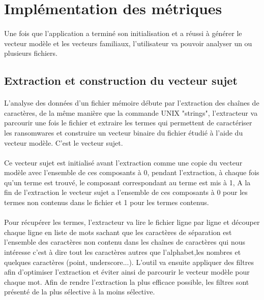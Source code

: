 \documentclass[a4paper, 12pt]{book}
\begin{document}
\section{Implémentation des métriques}
\paragraph{}
Une fois que l'application a terminé son initialisation et a réussi à générer le vecteur modèle et les vecteurs familiaux, l'utilisateur va pouvoir analyser un ou plusieurs fichiers.
\subsection{Extraction et construction du vecteur sujet}
\paragraph{}
	L'analyse des données d'un fichier mémoire débute par l'extraction des chaînes de caractères, de la même manière que la commande UNIX "strings", l'extracteur va parcourir une fois le fichier et extraire les termes qui permettent de caractériser les ransomwares et construire un vecteur binaire du fichier étudié à l'aide du vecteur modèle. C'est le vecteur sujet.
\paragraph{}
Ce vecteur sujet est initialisé avant l'extraction comme une copie du vecteur modèle avec l'ensemble de ces composants à 0, pendant l'extraction, à chaque fois qu'un terme est trouvé, le composant correspondant au terme est mis à 1, A la fin de l'extraction le vecteur sujet a l'ensemble de ces composants à 0 pour les termes non contenus dans le fichier et 1 pour les termes contenus.
\paragraph{}
Pour récupérer les termes, l'extracteur va lire le fichier ligne par ligne et découper chaque ligne en liste de mots sachant que les caractères de séparation est l'ensemble des caractères non contenu dans les chaînes de caractères qui nous intéresse c'est à dire tout les caractères autres que l'alphabet,les nombres et quelques caractères (point, underscore...). L'outil va ensuite appliquer des filtres afin d'optimiser l'extraction et éviter ainsi de parcourir le vecteur modèle pour chaque mot. Afin de rendre l'extraction la plus efficace possible, les filtres sont présenté de la plus sélective à la moins sélective.
\end{document}

